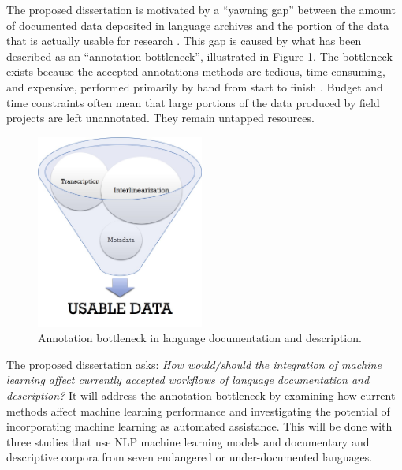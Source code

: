 The proposed dissertation is motivated by a “yawning gap” between the amount of documented data deposited in language archives and the portion of the data that is actually usable for research \citep{seifart_language_2018}. This gap is caused by what has been described as an ``annotation bottleneck'', illustrated in Figure \ref{fig:bottleneck}. The bottleneck exists because the accepted annotations methods are tedious, time-consuming, and expensive, performed primarily by hand from start to finish \citep{simons_worlds_2013,holton_developing_2017}.
Budget and time constraints often mean that large portions of the data produced by field projects are left unannotated. They remain untapped resources. 

\begin{figure}[hbt]
    \centering
    \includegraphics[width=5.5cm]{figs/AnnotationFunnel.jpg}
    \caption[Annotation Bottleneck]{Annotation bottleneck in language documentation and description.}
    \label{fig:bottleneck}
\end{figure}


The proposed dissertation asks: \emph{How would/should the integration of machine learning affect currently accepted workflows of language documentation and description?} It will address the annotation bottleneck by examining how current methods affect machine learning performance and investigating the potential of incorporating machine learning as automated assistance. This will be done with three studies that use NLP machine learning models and documentary and descriptive corpora from seven endangered or under-documented languages.

